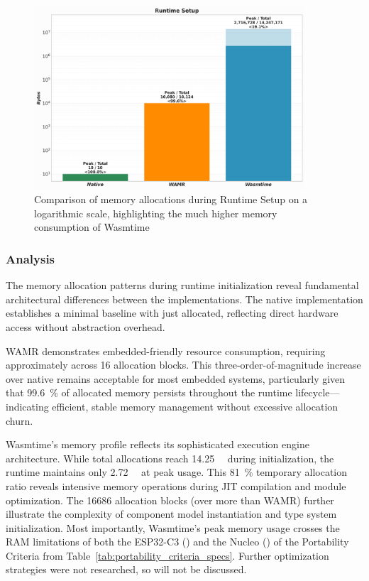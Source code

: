 \begin{figure}[H]
    \centering
    \includegraphics[width=0.9\textwidth]{images/mem_runtime.png}
    \caption{Comparison of memory allocations during Runtime Setup on a logarithmic scale, highlighting the much higher memory consumption of Wasmtime}
    \label{fig:mem_runtime}
\end{figure}

\subsubsection{Analysis}

The memory allocation patterns during runtime initialization reveal fundamental architectural differences between the implementations. The native implementation establishes a minimal baseline with just  allocated, reflecting direct hardware access without abstraction overhead.

WAMR demonstrates embedded-friendly resource consumption, requiring approximately  across 16 allocation blocks. This three-order-of-magnitude increase over native remains acceptable for most embedded systems, particularly given that \SI[round-precision=1]{99.6}{\percent} of allocated memory persists throughout the runtime lifecycle—indicating efficient, stable memory management without excessive allocation churn.

Wasmtime's memory profile reflects its sophisticated execution engine architecture. While total allocations reach \SI{14.25}{\mega\byte} during initialization, the runtime maintains only \SI{2.72}{\mega\byte} at peak usage. This \SI[round-precision=1]{81}{\percent} temporary allocation ratio reveals intensive memory operations during JIT compilation and module optimization. The \num[round-precision=0]{16686} allocation blocks (over  more than WAMR) further illustrate the complexity of component model instantiation and type system initialization. Most importantly, Wasmtime's peak memory usage crosses the RAM limitations of both the ESP32-C3 () and the Nucleo () of the Portability Criteria from Table~\ref{tab:portability_criteria_specs}. Further optimization strategies were not researched, so will not be discussed.


